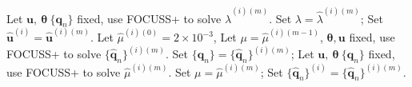 \documentclass[]{article}
\begin{document}
\begin{algorithm}[!tb]
\begin{algorithmic}[1]
        \STATE Let $\mathbf{u},~\boldsymbol{\theta}~\{\mathbf{q}_{n}\}$ fixed, use FOCUSS+ to solve $\hat{\lambda}^{(i)(m)}$. Set $\lambda = \hat{\lambda}^{(i)(m)}$;
      \ENDFOR
      \STATE Set $\hat{\mathbf{u}}^{(i)} = \hat{\mathbf{u}}^{(i)(m)}$.
      \STATE Let $\hat{\mu}^{(i)(0)} = 2 \times 10^{-3}$,
        \STATE Let $\mu = \hat{\mu}^{(i)(m-1)}$, $\boldsymbol{\theta},\mathbf{u}$ fixed, use FOCUSS+ to solve $\{\hat{\mathbf{q}}_{n}\}^{(i)(m)}$. Set $\{\mathbf{q}_{n}\} = \{\hat{\mathbf{q}}_{n}\}^{(i)(m)}$;
        \STATE Let $\mathbf{u},~\boldsymbol{\theta}~\{\mathbf{q}_{n}\}$ fixed, use FOCUSS+ to solve $\hat{\mu}^{(i)(m)}$. Set $\mu = \hat{\mu}^{(i)(m)}$;
      \ENDFOR
      \STATE Set $\{\hat{\mathbf{q}}_{n}\}^{(i)} =  \{\hat{\mathbf{q}}_{n}\}^{(i)(m)}$.
    \ENDFOR
  \end{algorithmic}
\end{algorithm}



\end{document}
